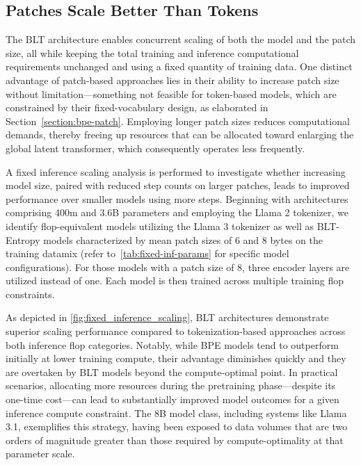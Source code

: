 \subsection{Patches Scale Better Than Tokens} The {\textsc BLT} architecture enables concurrent scaling of both the model and the patch size, all while keeping the total training and inference computational requirements unchanged and using a fixed quantity of training data. One distinct advantage of patch-based approaches lies in their ability to increase patch size without limitation—something not feasible for token-based models, which are constrained by their fixed-vocabulary design, as elaborated in Section~\ref{section:bpe-patch}. Employing longer patch sizes reduces computational demands, thereby freeing up resources that can be allocated toward enlarging the global latent transformer, which consequently operates less frequently.

A fixed inference scaling analysis is performed to investigate whether increasing model size, paired with reduced step counts on larger patches, leads to improved performance over smaller models using more steps. Beginning with architectures comprising 400m and 3.6B parameters and employing the Llama 2 tokenizer, we identify flop-equivalent models utilizing the Llama 3 tokenizer as well as {\textsc BLT}-Entropy models characterized by mean patch sizes of 6 and 8 bytes on the training datamix (refer to~\autoref{tab:fixed-inf-params} for specific model configurations). For those models with a patch size of 8, three encoder layers are utilized instead of one. Each model is then trained across multiple training flop constraints.

As depicted in \autoref{fig:fixed_inference_scaling}, {\textsc BLT} architectures demonstrate superior scaling performance compared to tokenization-based approaches across both inference flop categories. Notably, while BPE models tend to outperform initially at lower training compute, their advantage diminishes quickly and they are overtaken by {\textsc BLT} models beyond the compute-optimal point. In practical scenarios, allocating more resources during the pretraining phase—despite its one-time cost—can lead to substantially improved model outcomes for a given inference compute constraint. The 8B model class, including systems like Llama 3.1, exemplifies this strategy, having been exposed to data volumes that are two orders of magnitude greater than those required by compute-optimality at that parameter scale.

